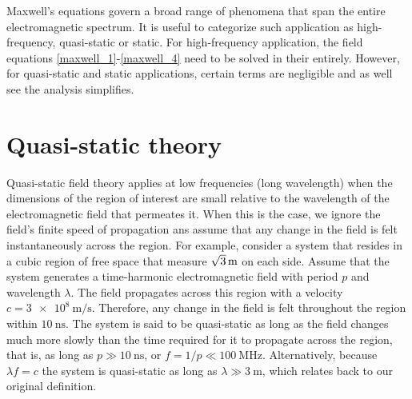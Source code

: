 \documentclass[11pt,a4paper,oneside]{book}
\numberwithin{equation}{section}
\theoremstyle{it}
\theoremstyle{definition}
\begin{document}
Maxwell's equations govern a broad range of phenomena that span the entire electromagnetic spectrum. It is useful to categorize such application as high-frequency, quasi-static or static. For high-frequency application, the field equations \ref{maxwell_1}-\ref{maxwell_4} need to be solved in their entirely. However, for quasi-static and static applications, certain terms are negligible and as well see the analysis simplifies.
\section{Quasi-static theory}
Quasi-static field theory applies at low frequencies (long wavelength) when the dimensions of the region of interest are small relative to the wavelength of the electromagnetic field that permeates it. When this is the case, we ignore the field's finite speed of propagation ans assume that any change in the field is felt instantaneously across the region. For example, consider a system that resides in a cubic region of free space that measure $\SI[parse-numbers=false]{\sqrt{3}}{\meter}$ on each side. Assume that the system generates a time-harmonic electromagnetic field with period $p$ and wavelength $\lambda$. The field propagates across this region with a velocity $c=\SI{3e8}{\meter\per\second}$. Therefore, any change in the field is felt throughout the region within $\SI{10}{\nano\second}$. The system is said to be quasi-static as long as the field changes much more slowly than the time required for it to propagate across the region, that is, as long as $p\gg\SI{10}{\nano\second}$, or $f=1/p\ll\SI{100}{\mega\hertz}$. Alternatively, because $\lambda f=c$ the system is quasi-static as long as $\lambda\gg\SI{3}{\meter}$, which relates back to our original definition.
\end{document}
